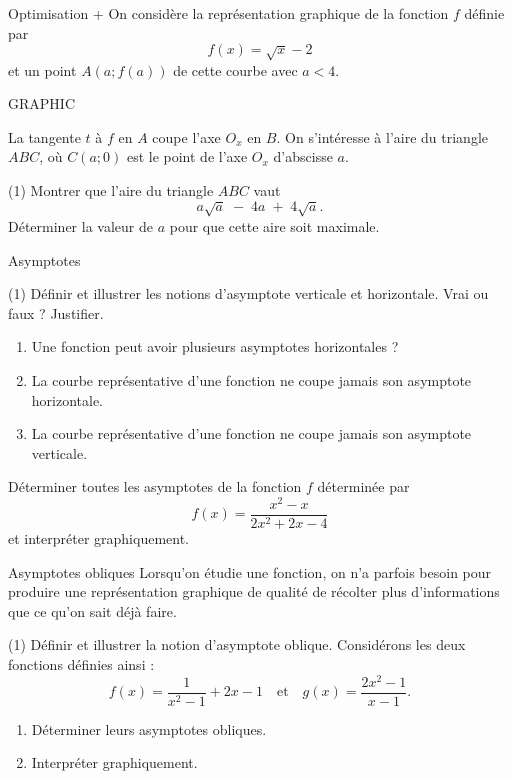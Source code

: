 \documentclass[a4paper,12pt]{article}
\begin{document}
\begin{activite}{Optimisation +}
\tcblower
On considère la représentation graphique de la fonction \(f\) définie par
\[
  f(x)=\sqrt{x}-2
\]
et un point \(A(a;f(a))\) de cette courbe avec \(a<4\).

\begin{center}
	GRAPHIC
\end{center}

La tangente \(t\) à \(f\) en \(A\) coupe l’axe \(O_x\) en \(B\). On s’intéresse à l’aire du triangle \(ABC\), où \(C(a;0)\) est le point de l’axe \(O_x\) d’abscisse \(a\).

\begin{tasks}(1)
  \task Montrer que l’aire du triangle \(ABC\) vaut
  \[
    a\sqrt{a} \;-\; 4a \;+\; 4\sqrt{a}.
  \]
  \task Déterminer la valeur de \(a\) pour que cette aire soit maximale.
\end{tasks}
\end{activite}

\begin{activite}{Asymptotes}
\tcblower
\begin{tasks}(1)
  \task Définir et illustrer les notions d’asymptote verticale et horizontale.
  \task Vrai ou faux ? Justifier.
    \begin{enumerate}
      \item Une fonction peut avoir plusieurs asymptotes horizontales ?
      \item La courbe représentative d’une fonction ne coupe jamais son asymptote horizontale.
      \item La courbe représentative d’une fonction ne coupe jamais son asymptote verticale.
    \end{enumerate}
  \task Déterminer toutes les asymptotes de la fonction \(f\) déterminée par
  \[
    f(x)=\dfrac{x^2 - x}{2x^2 + 2x - 4}
  \]
  et interpréter graphiquement.
\end{tasks}
\end{activite}

\begin{activite}{Asymptotes obliques}
\tcblower
Lorsqu'on étudie une fonction, on n'a parfois besoin pour produire une représentation graphique de qualité de récolter plus d'informations que ce qu'on sait déjà faire.
\begin{tasks}(1)
  \task Définir et illustrer la notion d'asymptote oblique.
  \task Considérons les deux fonctions définies ainsi : 
  \[
    f(x)=\dfrac{1}{x^2-1}+2x-1
    \quad\text{et}\quad
    g(x)=\dfrac{2x^2-1}{x-1}.
  \]
  \begin{enumerate}
    \item Déterminer leurs asymptotes obliques.
    \item Interpréter graphiquement.
  \end{enumerate}
\end{tasks}
\end{activite}
\end{document}
